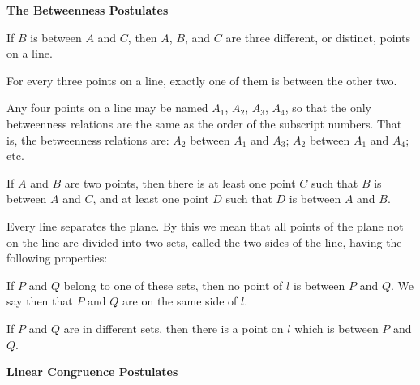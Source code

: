 \documentclass[11pt]{book}
\newcommand{\APPsub}[1]{%
  \par\medskip\begin{center}\bfseries\small #1\end{center}\par\nopagebreak}
\begin{document}
\APPsub{The Betweenness Postulates}

\begin{applist}[resume]
\item If $B$ is between $A$ and $C$, then $A$, $B$, and $C$ are three
      different, or distinct, points on a line.
\item For every three points on a line, exactly one of them is between the
      other two.
\item Any four points on a line may be named $A_1$, $A_2$, $A_3$, $A_4$, so
      that the only betweenness relations are the same as the order of the
      subscript numbers. That is, the betweenness relations are: $A_2$
      between $A_1$ and $A_3$; $A_2$ between $A_1$ and $A_4$; etc.
\item If $A$ and $B$ are two points, then there is at least one point $C$
      such that $B$ is between $A$ and $C$, and at least one point $D$ such
      that $D$ is between $A$ and $B$.
\item Every line separates the plane. By this we mean that all points of
      the plane not on the line are divided into two sets, called the two
      sides of the line, having the following properties:
      \begin{applist}
      \item If $P$ and $Q$ belong to one of these sets, then no point of
            $l$ is between $P$ and $Q$. We say then that $P$ and $Q$ are on
            the same side of $l$.
      \item If $P$ and $Q$ are in different sets, then there is a point on
            $l$ which is between $P$ and $Q$.
      \end{applist}
\end{applist}

\APPsub{Linear Congruence Postulates}
\end{document}
